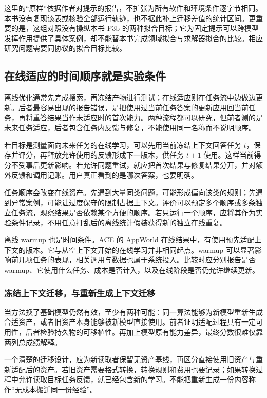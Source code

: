 这里的“原样”依据作者对提示的报告，不扩张为所有软件和环境条件逐字节相同。本书没有复现该表或核验全部运行轨迹，也不据此补上迁移差值的统计区间。更重要的是，这组对照没有操纵本书 P3b 的两种拟合目标；它为固定提示可以跨模型发挥作用提供了具体案例，却不能替本书完成领域拟合与求解器拟合的比较。相应研究问题需要同协议的拟合目标比较。

\subsection{在线适应的时间顺序就是实验条件}
\label{sec:ch07-online-order}

离线优化通常先完成搜索，再冻结产物进行测试；在线适应则在任务流中边做边更新。后者最容易出现的报告错误，是把使用过当前任务答案的更新应用回当前任务，再将重答结果当作未适应时的首次能力。两种流程都可以研究，但前者测的是未来任务适应，后者包含任务内反馈与修复，不能使用同一名称而不说明顺序。

若目标是测量面向未来任务的在线学习，可以先用当前冻结上下文回答任务 $t$，保存并评分，再释放允许使用的反馈形成下一版本，供任务 $t+1$ 使用。这样当前得分不受事后更新影响。若允许同题重试，就应把首次结果与修复结果分开，并对额外反馈和调用记账。用户真正看到的是哪次答案，也要明确。

任务顺序会改变在线资产。先遇到大量同类问题，可能形成偏向该类的规则；先遇到异常案例，可能让过度保守的限制占据上下文。评价可以预定多个顺序或多条独立任务流，观察结果是否依赖某个方便的顺序。若只运行一个顺序，应将其作为实验条件记录，不用任意打乱后的离线统计假装获得新的独立在线重复。

离线 warmup 也是时间条件。ACE 的 AppWorld 在线结果中，有使用预先适配上下文的版本\cite{ace-2510}。它与从空上下文开始的在线学习并非相同起点。warmup 可以显著影响前几项任务的表现，相关调用与数据也属于系统投入。比较时应分别报告是否 warmup、它使用什么任务、成本是否计入，以及在线阶段是否仍允许继续更新。

\subsubsection{冻结上下文迁移，与重新生成上下文迁移}

当方法换了基础模型仍然有效，至少有两种可能：同一算法能够为新模型重新生成合适资产，或者旧资产本身能够被新模型直接使用。前者证明适配过程具有一定可用性，后者检验持久物的可移植性。再加上模型原有能力差异，最终分数很难仅靠两列总成绩解释。

一个清楚的迁移设计，应为新读取者保留无资产基线，再区分直接使用旧资产与重新适配后的资产。若旧资产需要格式转换，转换规则和费用也要记录；如果转换过程中允许读取目标任务反馈，就已经包含新的学习。不能把重新生成一份内容称作“无成本搬迁同一份经验”。

